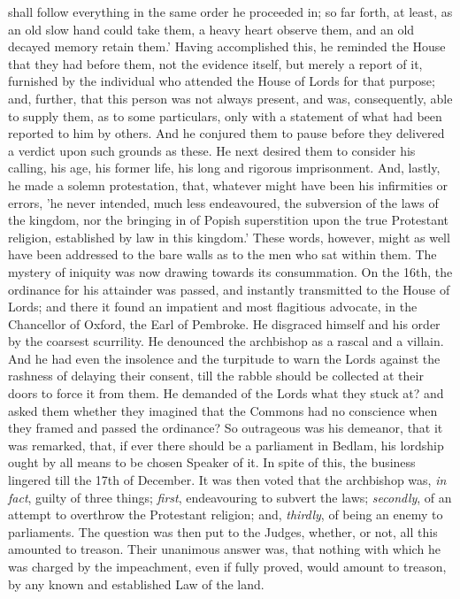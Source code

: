 shall follow everything in the same order he proceeded in; so far forth,
at least, as an old slow hand could take them, a heavy heart observe
them, and an old decayed memory retain them.' Having accomplished this,
he reminded the House that they had before them, not the evidence
itself, but merely a report of it, furnished by the individual who
attended the House of Lords for that purpose; and, further, that this
person was not always present, and was, consequently, able to supply
them, as to some particulars, only with a statement of what had been
reported to him by others. And he conjured them to pause before they
delivered a verdict upon such grounds as these. He next desired them to
consider his calling, his age, his former life, his long and rigorous
imprisonment. And, lastly, he made a solemn protestation, that, whatever
might have been his infirmities or errors, 'he never intended, much less
endeavoured, the subversion of the laws of the kingdom, nor the bringing
in of Popish superstition upon the true Protestant religion, established
by law in this kingdom.' These words, however, might as well have been
addressed to the bare walls as to the men who sat within them. The
mystery of iniquity was now drawing towards its consummation. On the
16th, the ordinance for his attainder was passed, and instantly
transmitted to the House of Lords; and there it found an impatient and
most flagitious advocate, in the Chancellor of Oxford, the Earl of
Pembroke. He disgraced himself and his order by the coarsest scurrility.
He denounced the archbishop as a rascal and a villain. And he had even
the insolence and the turpitude to warn the Lords against the rashness
of delaying their consent, till the rabble should be collected at their
doors to force it from them. He demanded of the Lords what they stuck
at? and asked them whether they imagined that the Commons had no
conscience when they framed and passed the ordinance? So outrageous was
his demeanor, that it was remarked, that, if ever there should be a
parliament in Bedlam, his lordship ought by all means to be chosen
Speaker of it. In spite of this, the business lingered till the 17th of
December. It was then voted that the archbishop was, \emph{in fact},
guilty of three things; \emph{first}, endeavouring to subvert the laws; \emph{secondly},
of an attempt to overthrow the Protestant religion; and, \emph{thirdly},
of being an enemy to parliaments. The question was then put to the
Judges, whether, or not, all this amounted to treason. Their unanimous
answer was, that nothing with which he was charged by the impeachment,
even if fully proved, would amount to treason, by any known and
established Law of the land.

